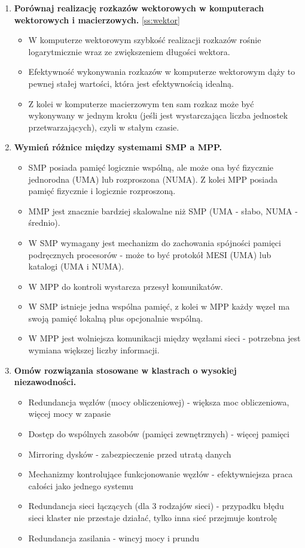 \begin{enumerate}
\begin{itemize}
			\end{itemize}
			\item \textbf{Porównaj realizację rozkazów wektorowych w komputerach wektorowych i macierzowych.}
			\ref{ss:wektor}
			\begin{itemize}
				\item W komputerze wektorowym szybkość realizacji rozkazów rośnie logarytmicznie wraz ze zwiększeniem długości wektora.
				\item Efektywność wykonywania rozkazów w komputerze wektorowym dąży to pewnej stałej wartości, która jest efektywnością idealną.
				\item Z kolei w komputerze macierzowym ten sam rozkaz może być wykonywany w jednym kroku (jeśli jest wystarczająca liczba jednostek przetwarzających), czyli w stałym czasie.
			\end{itemize}
			\item \textbf{Wymień różnice między systemami SMP a MPP.}
			\begin{itemize}
				\item SMP posiada pamięć logicznie wspólną, ale może ona być fizycznie jednorodna (UMA) lub rozproszona (NUMA). Z kolei MPP posiada pamięć fizycznie i logicznie rozproszoną.
				\item MMP jest znacznie bardziej skalowalne niż SMP (UMA - słabo, NUMA - średnio).
				\item W SMP wymagany jest mechanizm do zachowania spójności pamięci podręcznych procesorów - może to być protokół MESI (UMA) lub katalogi (UMA i NUMA).
				\item W MPP do kontroli wystarcza przesył komunikatów.
				\item W SMP istnieje jedna wspólna pamięć, z kolei w MPP każdy węzeł ma swoją pamięć lokalną plus opcjonalnie wspólną.
				\item W MPP jest wolniejsza komunikacji między węzłami sieci - potrzebna jest wymiana większej liczby informacji.
			\end{itemize}
			\item \textbf{Omów rozwiązania stosowane w klastrach o wysokiej niezawodności.}
			\begin{itemize}
				\item Redundancja węzłów (mocy obliczeniowej) - większa moc obliczeniowa, więcej mocy w zapasie
				\item Dostęp do wspólnych zasobów (pamięci zewnętrznych) - więcej pamięci
				\item Mirroring dysków - zabezpieczenie przed utratą danych
				\item Mechanizmy kontrolujące funkcjonowanie węzłów - efektywniejsza praca całości jako jednego systemu
				\item Redundancja sieci łączących (dla 3 rodzajów sieci) - przypadku błędu sieci klaster nie przestaje działać, tylko inna sieć przejmuje kontrolę
				\item Redundancja zasilania - wincyj mocy i prundu
			\end{itemize}
		\end{enumerate}